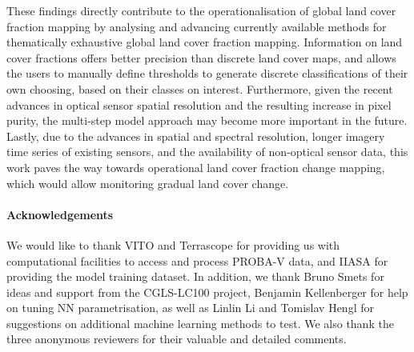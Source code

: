 \documentclass[review,authoryear,3p]{elsarticle}
\newcommand{\minisection}[1]{\paragraph{#1}}%
\begin{document}
These findings directly contribute to the operationalisation of global land cover fraction mapping by analysing and advancing currently available methods for thematically exhaustive global land cover fraction mapping.
Information on land cover fractions offers better precision than discrete land cover maps, and allows the users to manually define thresholds to generate discrete classifications of their own choosing, based on their classes on interest.
Furthermore, given the recent advances in optical sensor spatial resolution and the resulting increase in pixel purity, the multi-step model approach may become more important in the future.
Lastly, due to the advances in spatial and spectral resolution, longer imagery time series of existing sensors, and the availability of non-optical sensor data, this work paves the way towards operational land cover fraction change mapping, which would allow monitoring gradual land cover change.


\minisection{Acknowledgements} We would like to thank VITO and Terrascope for providing us with computational facilities to access and process {PROBA-V} data, and IIASA for providing the model training dataset. In addition, we thank Bruno Smets for ideas and support from the \gls{CGLS-LC100} project, Benjamin Kellenberger for help on tuning \gls{NN} parametrisation, as well as Linlin Li and Tomislav Hengl for suggestions on additional machine learning methods to test. We also thank the three anonymous reviewers for their valuable and detailed comments.


\end{document}
